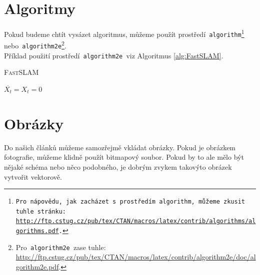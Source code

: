 \documentclass[11pt, a4paper]{article}
\begin{document}
\section{Algoritmy} \label{alg:sec}
Pokud budeme chtít vysázet algoritmus, můžeme použít prostředí\texttt{ algorithm\footnote{Pro nápovědu, jak zacházet s~prostředím\texttt{ algorithm, }můžeme zkusit tuhle stránku:\\\url{http://ftp.cstug.cz/pub/tex/CTAN/macros/latex/contrib/algorithms/algorithms.pdf}.} }nebo\texttt{ algorithm2e}\footnote{Pro\texttt{ algorithm2e }zase tuhle: \url{http://ftp.cstug.cz/pub/tex/CTAN/macros/latex/contrib/algorithm2e/doc/algorithm2e.pdf}.}.\\
Příklad použití prostředí\texttt{ algorithm2e }viz Algoritmus \ref{alg:FastSLAM}.

\vspace{7mm}
\begin{algorithm}[H] \label{alg:FastSLAM}
\caption{\textsc{FastSLAM}}
\SetNlSkip{-1.2em}
\SetInd{1em}{1em}
\SetNlSty{}{}{:}

\Indp\Indpp
\BlankLine

$\overline{X_t} = X_t = 0$\\


\end{algorithm}
\bigskip


\section{Obrázky}
Do našich článků můžeme samozřejmě vkládat obrázky. Pokud je obrázkem fotografie,
můžeme klidně použít bitmapový soubor. Pokud by to ale mělo být nějaké schéma nebo
něco podobného, je dobrým zvykem takovýto obrázek vytvořit vektorově.
\end{document}
